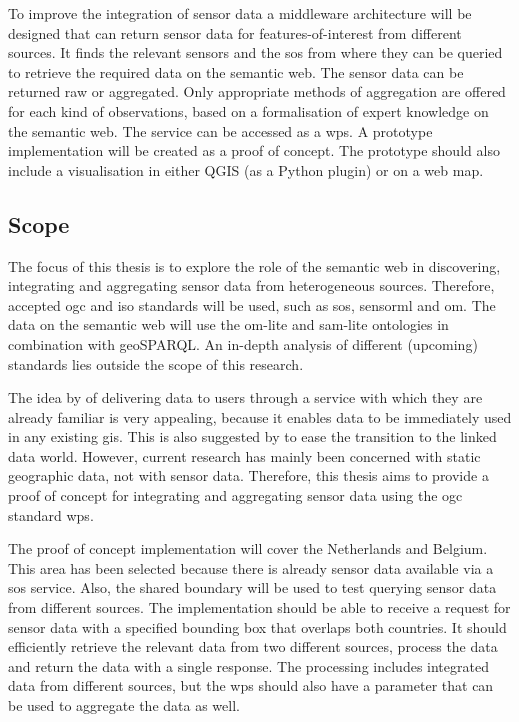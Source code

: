 To improve the integration of sensor data a middleware architecture will be designed that can return sensor data for features-of-interest from different sources. It finds the relevant sensors and the \ac{sos} from where they can be queried to retrieve the required data on the semantic web. The sensor data can be returned raw or aggregated. Only appropriate methods of aggregation are offered for each kind of observations, based on a formalisation of expert knowledge on the semantic web. The service can be accessed as a \ac{wps}. A prototype implementation will be created as a proof of concept. The prototype should also include a visualisation in either QGIS (as a Python plugin) or on a web map. 

\subsection{Scope}
The focus of this thesis is to explore the role of the semantic web in discovering, integrating and aggregating sensor data from heterogeneous sources. Therefore, accepted \ac{ogc} and \ac{iso} standards will be used, such as \ac{sos}, \ac{sensorml} and \ac{om}. The data on the semantic web will use the om-lite and sam-lite ontologies in combination with geoSPARQL. An in-depth analysis of different (upcoming) standards lies outside the scope of this research. 

The idea by \cite{SW:Jones} of delivering data to users through a service with which they are already familiar is very appealing, because it enables data to be immediately used in any existing \ac{gis}. This is also suggested by \cite{SSW:Atkinson} to ease the transition to the linked data world. However, current research has mainly been concerned with static geographic data, not with sensor data. Therefore, this thesis aims to provide a proof of concept for integrating and aggregating sensor data using the \ac{ogc} standard \ac{wps}.

The proof of concept implementation will cover the Netherlands and Belgium. This area has been selected because there is already sensor data available via a \ac{sos} service. Also, the shared boundary will be used to test querying sensor data from different sources. The implementation should be able to receive a request for sensor data with a specified bounding box that overlaps both countries. It should efficiently retrieve the relevant data from two different sources, process the data and return the data with a single response. The processing includes integrated data from different sources, but the \ac{wps} should also have a parameter that can be used to aggregate the data as well.     





